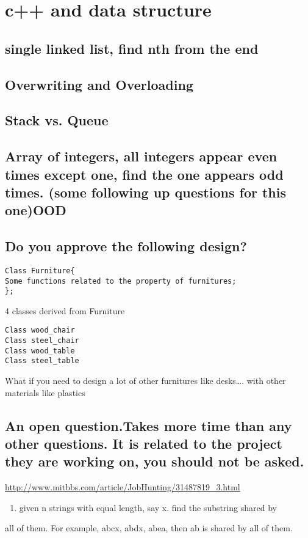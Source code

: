 \documentclass[12pt]{book}
\begin{document}
\chapter{c++ and data structure}
\label{sec-11}
\section{single linked list, find nth from the end}
\label{sec-11-1}
\section{Overwriting and Overloading}
\label{sec-11-2}
\section{Stack vs. Queue}
\label{sec-11-3}
\section{Array of integers, all integers appear even times except one, find the one appears odd times. (some following up questions for this one)OOD}
\label{sec-11-4}
\section{Do you approve the following design?}
\label{sec-11-5}
\lstset{language=java,label= ,caption= ,numbers=none}
\begin{lstlisting}
Class Furniture{    
Some functions related to the property of furnitures;
};
\end{lstlisting}
4 classes derived from Furniture
\lstset{language=java,label= ,caption= ,numbers=none}
\begin{lstlisting}
Class wood_chair
Class steel_chair
Class wood_table
Class steel_table
\end{lstlisting}
What if you need to design a lot of other furnitures like desks\ldots{}. with other materials like plastics 
\section{An open question.Takes more time than any other questions. It is related to the project they are working on, you should not be asked.}
\label{sec-11-6}

\url{http://www.mitbbs.com/article/JobHunting/31487819_3.html}

\begin{enumerate}
\item given n strings with equal length, say x. find the substring shared by
\end{enumerate}
all of them. For example, abcx, abdx, abea, then ab is shared by all of them.
\end{document}
